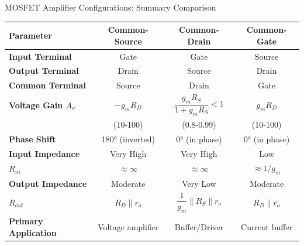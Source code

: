 \documentclass[10pt, aspectratio=169]{beamer}
\begin{document}

\begin{frame}{MOSFET Amplifier Configurations: Summary Comparison}
\begin{table}
\centering
\small
\begin{tabular}{|l|c|c|c|}
\hline
\textbf{Parameter} & \textbf{Common-Source} & \textbf{Common-Drain} & \textbf{Common-Gate} \\
\hline
\hline
\textbf{Input Terminal} & Gate & Gate & Source \\
\hline
\textbf{Output Terminal} & Drain & Source & Drain \\
\hline
\textbf{Common Terminal} & Source & Drain & Gate \\
\hline
\hline
\textbf{Voltage Gain $A_v$} & $-g_m R_D$ & $\dfrac{g_m R_S}{1 + g_m R_S} < 1$ & $g_m R_D$ \\
& (10-100) & (0.8-0.99) & (10-100) \\
\hline
\textbf{Phase Shift} & 180° (inverted) & 0° (in phase) & 0° (in phase) \\
\hline
\hline
\textbf{Input Impedance} & Very High & Very High & Low \\
$R_{in}$ & $\approx \infty$ & $\approx \infty$ & $\approx 1/g_m$ \\
\hline
\textbf{Output Impedance} & Moderate & Very Low & Moderate \\
$R_{out}$ & $R_D \| r_o$ & $\dfrac{1}{g_m} \| R_S \| r_o$ & $R_D \| r_o$ \\
\hline
\hline
\textbf{Primary Application} & Voltage amplifier & Buffer/Driver & Current buffer \\

\hline
\end{tabular}
\end{table}
\end{frame}
\end{document}
